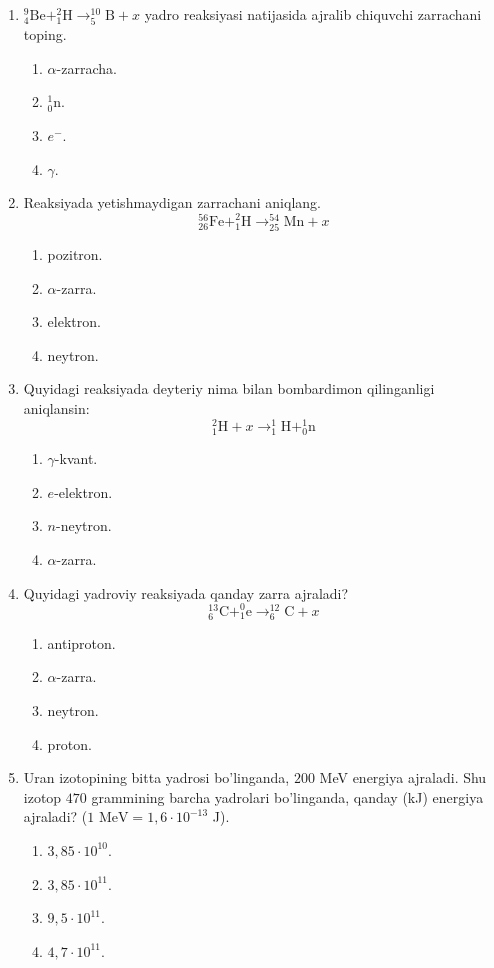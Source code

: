 \begin{enumerate}
\item $^{9}_4\text{Be} + ^2_1\text{H} \rightarrow ^{10}_5\text{B} + x$ yadro reaksiyasi natijasida ajralib chiquvchi zarrachani toping.
\begin{enumerate}[label=\Alph*)]
\item $\alpha$-zarracha.
\item $^1_0\text{n}$.
\item $e^-$.
\item $\gamma$.
\end{enumerate}

\item Reaksiyada yetishmaydigan zarrachani aniqlang.
$$^{56}_{26}\text{Fe} + ^2_1\text{H} \rightarrow ^{54}_{25}\text{Mn} + x$$
\begin{enumerate}[label=\Alph*)]
\item pozitron.
\item $\alpha$-zarra.
\item elektron.
\item neytron.
\end{enumerate}

\item Quyidagi reaksiyada deyteriy nima bilan bombardimon qilinganligi aniqlansin:
$$^2_1\text{H} + x \rightarrow ^1_1\text{H} + ^1_0\text{n}$$
\begin{enumerate}[label=\Alph*)]
\item $\gamma$-kvant.
\item $e$-elektron.
\item $n$-neytron.
\item $\alpha$-zarra.
\end{enumerate}

\setcounter{enumi}{22}
\item Quyidagi yadroviy reaksiyada qanday zarra ajraladi?
$$^{13}_6\text{C} + ^0_1\text{e} \rightarrow ^{12}_6\text{C} + x$$
\begin{enumerate}[label=\Alph*)]
\item antiproton.
\item $\alpha$-zarra.
\item neytron.
\item proton.
\end{enumerate}

\item Uran izotopining bitta yadrosi bo'linganda, $200$ MeV energiya ajraladi. Shu izotop $470$ grammining barcha yadrolari bo'linganda, qanday (kJ) energiya ajraladi? ($1\text{ MeV}=1,6\cdot 10^{-13}$ J).
\begin{enumerate}[label=\Alph*)]
\item $3,85\cdot 10^{10}$.
\item $3,85\cdot 10^{11}$.
\item $9,5\cdot 10^{11}$.
\item $4,7\cdot 10^{11}$.
\end{enumerate}


\end{enumerate}
